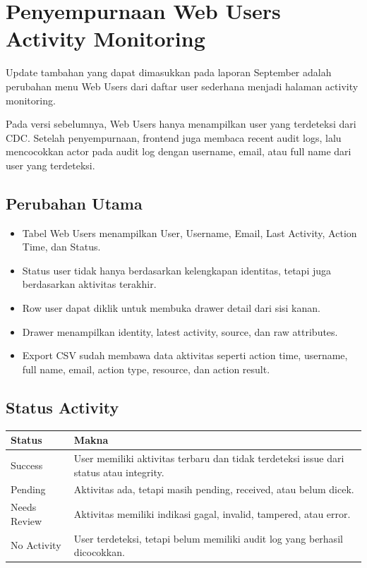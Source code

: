 

\section{Penyempurnaan Web Users Activity Monitoring}

Update tambahan yang dapat dimasukkan pada laporan September adalah perubahan menu Web Users dari daftar user sederhana menjadi halaman activity monitoring.

Pada versi sebelumnya, Web Users hanya menampilkan user yang terdeteksi dari CDC. Setelah penyempurnaan, frontend juga membaca recent audit logs, lalu mencocokkan actor pada audit log dengan username, email, atau full name dari user yang terdeteksi.

\subsection{Perubahan Utama}

\begin{itemize}
    \item Tabel Web Users menampilkan User, Username, Email, Last Activity, Action Time, dan Status.
    \item Status user tidak hanya berdasarkan kelengkapan identitas, tetapi juga berdasarkan aktivitas terakhir.
    \item Row user dapat diklik untuk membuka drawer detail dari sisi kanan.
    \item Drawer menampilkan identity, latest activity, source, dan raw attributes.
    \item Export CSV sudah membawa data aktivitas seperti action time, username, full name, email, action type, resource, dan action result.
\end{itemize}

\subsection{Status Activity}

\begin{longtable}{p{4cm}p{9cm}}
\toprule
\textbf{Status} & \textbf{Makna} \\
\midrule
Success & User memiliki aktivitas terbaru dan tidak terdeteksi issue dari status atau integrity. \\
\midrule
Pending & Aktivitas ada, tetapi masih pending, received, atau belum dicek. \\
\midrule
Needs Review & Aktivitas memiliki indikasi gagal, invalid, tampered, atau error. \\
\midrule
No Activity & User terdeteksi, tetapi belum memiliki audit log yang berhasil dicocokkan. \\
\bottomrule
\end{longtable}


